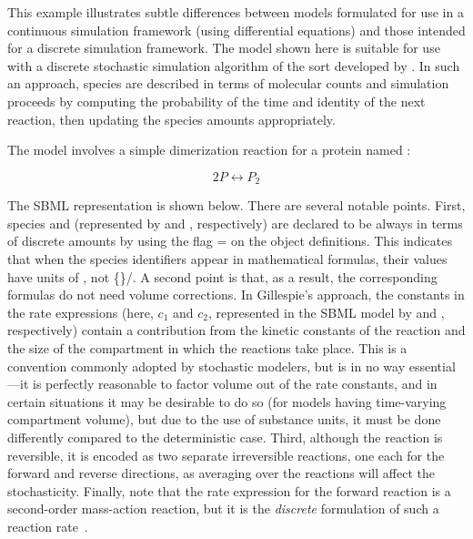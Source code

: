 This example illustrates subtle differences between models
formulated for use in a continuous simulation framework (\eg using
differential equations) and those intended for a discrete
simulation framework.  The model shown here is suitable for use
with a discrete stochastic simulation algorithm of the sort
developed by \cite{gillespie:1977}.  In such an approach, species
are described in terms of molecular counts and simulation
proceeds by computing the probability of the time and identity of
the next reaction, then updating the species amounts
appropriately.

The model involves a simple dimerization reaction for a protein
named :
\begin{linenomath}
\begin{equation*}
    2 P  \leftrightarrow  P_2
\end{equation*}
\end{linenomath}
The SBML representation is shown below.  There are several notable
points.  First, species  and  (represented
by  and , respectively) are declared to be always
in terms of discrete amounts by using the flag
= on the \Species object
definitions.  This indicates that when the species identifiers
appear in mathematical formulas, their values have units of
, not \{\}/.  A second point is that, as a result,
the corresponding \KineticLaw formulas do not need volume
corrections.  In Gillespie's approach, the constants in the rate
expressions (here, $c_1$ and $c_2$, represented in the SBML model
by  and , respectively) contain a contribution
from the kinetic constants of the reaction and the size of the
compartment in which the reactions take place.  This is a
convention commonly adopted by stochastic modelers, but is in no
way essential---it is perfectly reasonable to factor volume out of
the rate constants, and in certain situations it may be desirable
to do so (\eg for models having time-varying compartment volume),
but due to the use of substance units, it must be done differently
compared to the deterministic case.  Third, although the reaction
is reversible, it is encoded as two separate irreversible
reactions, one each for the forward and reverse directions, as
averaging over the reactions will affect the stochasticity.
Finally, note that the rate expression for the forward reaction is
a second-order mass-action reaction, but it is the \emph{discrete}
formulation of such a reaction rate~\citep{gillespie:1977}.

